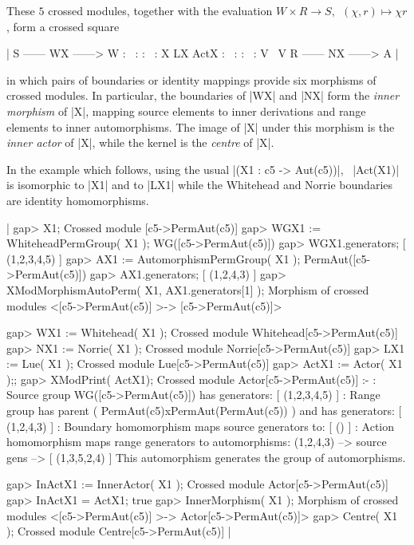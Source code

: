 These $5$ crossed modules, together with the evaluation  
$W \times R \to S, \ \ (\chi,r) \mapsto \chi r$, 
form a crossed square\:

|                        S ------ WX ------> W
                        :  \                :
                        :     \             :
                        X        LX        ActX
                        :           \       :
                        :              \    :
                        V                 \ V
                        R ------ NX ------> A  |


in which   pairs   of boundaries  or  identity  mappings   provide six
morphisms of crossed modules.   In particular, the boundaries of  |WX|
and |NX|   form the  \emph{inner   morphism} of  |X|,   mapping source
elements to   inner    derivations  and  range  elements     to  inner
automorphisms.   The image  of    |X| under  this  morphism  is    the
\emph{inner actor}  of |X|, while  the kernel  is the \emph{centre} of
|X|.

In the example which follows, using the usual |(X1 : c5 -> Aut(c5))|,
\ |Act(X1)|  is isomorphic to  |X1|  and to  |LX1|  
while the Whitehead and Norrie boundaries are identity homomorphisms.

|    gap> X1;
    Crossed module [c5->PermAut(c5)]
    gap> WGX1 := WhiteheadPermGroup( X1 );
    WG([c5->PermAut(c5)])
    gap> WGX1.generators;
    [ (1,2,3,4,5) ]
    gap> AX1 := AutomorphismPermGroup( X1 );
    PermAut([c5->PermAut(c5)])
    gap> AX1.generators;
    [ (1,2,4,3) ]
    gap> XModMorphismAutoPerm( X1, AX1.generators[1] );
    Morphism of crossed modules <[c5->PermAut(c5)] >-> [c5->PermAut(c5)]>

    gap> WX1 := Whitehead( X1 );
    Crossed module Whitehead[c5->PermAut(c5)]
    gap> NX1 := Norrie( X1 );
    Crossed module Norrie[c5->PermAut(c5)]
    gap> LX1 := Lue( X1 );
    Crossed module Lue[c5->PermAut(c5)]
    gap> ActX1 := Actor( X1 );;
    gap> XModPrint( ActX1);
    Crossed module Actor[c5->PermAut(c5)] :- 
    : Source group WG([c5->PermAut(c5)]) has generators:
      [ (1,2,3,4,5) ]
    : Range group has parent ( PermAut(c5)xPermAut(PermAut(c5)) )
        and has generators:  [ (1,2,4,3) ]
    : Boundary homomorphism maps source generators to:
      [ () ]
    : Action homomorphism maps range generators to automorphisms:
      (1,2,4,3) --> { source gens --> [ (1,3,5,2,4) ] }
      This automorphism generates the group of automorphisms.

    gap> InActX1 := InnerActor( X1 );
    Crossed module Actor[c5->PermAut(c5)]
    gap> InActX1 = ActX1;
    true
    gap> InnerMorphism( X1 );
    Morphism of crossed modules
        <[c5->PermAut(c5)] >-> Actor[c5->PermAut(c5)]>
    gap> Centre( X1 );
    Crossed module Centre[c5->PermAut(c5)]  |

